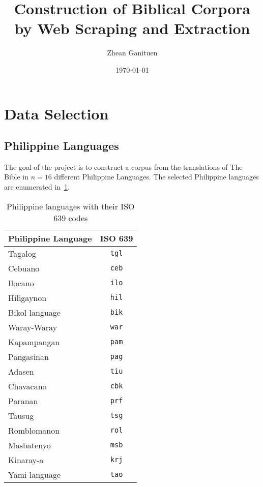 \documentclass{article}
\title{Construction of Biblical Corpora by Web Scraping and Extraction}
\author{Zhean Ganituen}
\date{\today}
\begin{document}
\maketitle
\tableofcontents

\section{Data Selection}

\subsection{Philippine Languages}

The goal of the project is to construct a corpus from the translations of The
Bible in \( n = 16 \) different Philippine Languages. The selected Philippine
languages are enumerated in~\cref{tab:ph_languages}.

\begin{table}[h!]
    \centering
    \begin{tabular}{lc}
        \hline
        \textbf{Philippine Language} & \textbf{ISO 639} \\
        \hline
        Tagalog                      & \texttt{tgl}     \\
        Cebuano                      & \texttt{ceb}     \\
        Ilocano                      & \texttt{ilo}     \\
        Hiligaynon                   & \texttt{hil}     \\
        Bikol language~\footnotemark & \texttt{bik}     \\
        Waray-Waray                  & \texttt{war}     \\
        Kapampangan                  & \texttt{pam}     \\
        Pangasinan                   & \texttt{pag}     \\
        Adasen                       & \texttt{tiu}     \\
        Chavacano                    & \texttt{cbk}     \\
        Paranan                      & \texttt{prf}     \\
        Tausug                       & \texttt{tsg}     \\
        Romblomanon                  & \texttt{rol}     \\
        Masbatenyo                   & \texttt{msb}     \\
        Kinaray-a                    & \texttt{krj}     \\
        Yami language                & \texttt{tao}     \\
        \hline
    \end{tabular}
    \caption{Philippine languages with their ISO 639 codes}\label{tab:ph_languages}
\end{table}
\end{document}
